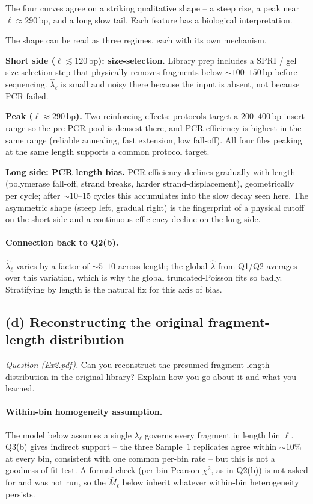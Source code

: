 \documentclass[11pt,a4paper]{article}
\newcommand{\hlam}{\hat{\lambda}}
\newcommand{\hM}{\hat{M}}
\begin{document}
The four curves agree on a striking qualitative shape -- a steep rise, a peak near
$\ell \approx 290\,\text{bp}$, and a long slow tail. Each feature has a biological
interpretation.

The shape can be read as three regimes, each with its own mechanism.

\textbf{Short side ($\ell \lesssim 120\,\text{bp}$): size-selection.}
Library prep includes a SPRI / gel size-selection step that physically removes
fragments below $\sim 100$--$150\,\text{bp}$ before sequencing. $\hlam_\ell$ is
small and noisy there because the input is absent, not because PCR failed.

\textbf{Peak ($\ell \approx 290\,\text{bp}$).}
Two reinforcing effects: protocols target a $200$--$400\,\text{bp}$ insert
range so the pre-PCR pool is densest there, and PCR efficiency is highest in
the same range (reliable annealing, fast extension, low fall-off). All four
files peaking at the same length supports a common protocol target.

\textbf{Long side: PCR length bias.}
PCR efficiency declines gradually with length (polymerase fall-off, strand
breaks, harder strand-displacement), geometrically per cycle; after
$\sim 10$--$15$ cycles this accumulates into the slow decay seen here. The
asymmetric shape (steep left, gradual right) is the fingerprint of a physical
cutoff on the short side and a continuous efficiency decline on the long side.

\paragraph{Connection back to Q2(b).}
$\hlam_\ell$ varies by a factor of $\sim 5$--$10$ across length; the global
$\hlam$ from Q1/Q2 averages over this variation, which is why the global
truncated-Poisson fits so badly. Stratifying by length is the natural fix for
this axis of bias.

\subsection{(d) Reconstructing the original fragment-length distribution}

\emph{Question (Ex2.pdf).} Can you reconstruct the presumed fragment-length
distribution in the original library? Explain how you go about it and what
you learned.

\paragraph{Within-bin homogeneity assumption.}
The model below assumes a single $\lambda_\ell$ governs every fragment in length
bin $\ell$. Q3(b) gives indirect support -- the three Sample~1 replicates agree
within $\sim 10\%$ at every bin, consistent with one common per-bin rate -- but
this is not a goodness-of-fit test. A formal check (per-bin Pearson $\chi^{2}$,
as in Q2(b)) is not asked for and was not run, so the $\hM_\ell$ below inherit
whatever within-bin heterogeneity persists.
\end{document}
